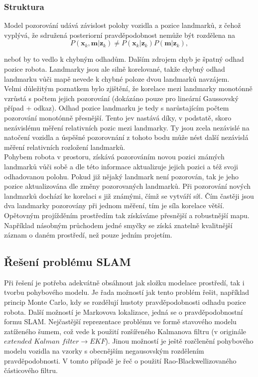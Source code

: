 \documentclass[12pt]{article}
\begin{document}
\subsubsection{Struktura}
Model pozorování udává závislost polohy vozidla a pozice landmarků, z čehož vyplývá, že sdružená posteriorní pravděpodobnost nemůže být rozdělena na
\begin{equation}
	P(\textbf{x}_k,\textbf{m}|\textbf{z}_k)\neq P(\textbf{x}_k|\textbf{z}_k)P(\textbf{m}|\textbf{z}_k),
\end{equation}

neboť by to vedlo k chybným odhadům. Dalším zdrojem chyb je špatný odhad pozice robota. Landmarky jsou ale silně korelované, takže chybný odhad landmarku vůči mapě nevede k chybné poloze dvou landmarků navzájem.\\
\indent Velmi důležitým poznatkem bylo zjištění, že korelace mezi landmarky monotónně vzrůstá s počtem jejich pozorování (dokázáno pouze pro lineární Gaussovský případ + odkaz). Odhad pozice landmarku je tedy s narůstajícím počtem pozorování monotónně přesnější. Tento jev nastává díky, v podstatě, skoro nezávislému měření relativních pozic mezi landmarky. Ty jsou zcela nezávislé na natočení vozidla a úspěšné pozorovnání z tohoto bodu může nést další nezávislá měření relativních rozložení landmarků. \\
\indent Pohybem robota v prostoru, získává pozorováním novou pozici známých landmarků vůči sobě a dle této informace aktualizuje jejich pozici a též svoji odhadovanou polohu. Pokud již nějaký landmark není pozorován, tak je jeho pozice aktualizována dle změny pozorovaných landmarků. Při pozorování nových landmarků dochází ke korelaci s již známými, čímž se vytváří síť. Čím častěji jsou dva landmarky pozorovány při jednom měření, tím je síla korelace větší. Opětovným projížděním prostředím tak získáváme přesnější a robustnější mapu. Například násobným průchodem jedné smyčky se získá znatelně kvalitnější záznam o daném prostředí, než pouze jedním projetím.\\

\newpage
\subsection{Řešení problému SLAM}
Při řešení je potřeba adekvátně obsáhnout jak složku modelace prostředí, tak i tvorbu pohybového modelu.
Je řada možností jak tento problém řešit, například princip Monte Carlo, kdy se rozdělují hustoty pravděpodobnosti odhadu pozice robota. Další možností je Markovova lokalizace, jedná se o pravděpodobnostní formu SLAM. Nejčastější reprezentace problému ve formě stavového modelu zatíženého šumem, což vede k použití rozšířeného Kalmanova filtru (v originále $extended$ $Kalman$ $filter\rightarrow EKF$). Jinou možností je ještě rozčlenění pohybového modelu vozidla na vzorky s obecnějším negausovským rozdělením pravděpodobnosti. V tomto případě je řeč o použití Rao-Blackwellizovaného částicového filtru. 
\\
\end{document}
